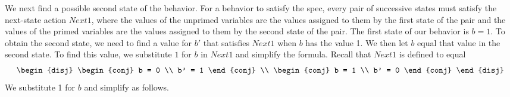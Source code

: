 We next find a possible second state of the behavior.  For a behavior
to satisfy the spec, every pair of successive states must satisfy the
next-state action $Next1$, where the values of the unprimed variables
are the values assigned to them by the first state of the pair and the
values of the primed variables are the values assigned to them by the
second state of the pair.  The first state of our behavior is $b=1$.
To obtain the second state, we need to find a value for $b'$ that
satisfies $Next1$ when $b$ has the value 1.  We then let $b$ equal
that value in the second state.  To find this value, we substitute
$1$ for $b$ in $Next1$ and simplify the formula.  Recall that $Next1$
is defined to equal
 \[ \begin{disj}
    \begin{conj}
            b = 0 \\
            b' = 1
     \end{conj} \\
      \begin{conj}
         b = 1 \\
         b' = 0
     \end{conj}
    \end{disj}
 \]
We substitute 1 for $b$ and simplify as follows.
